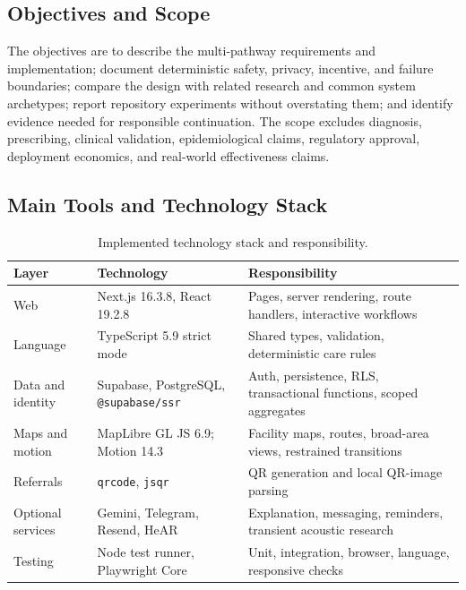 \documentclass[12pt,onecolumn]{IEEEtran}
\newcommand{\code}[1]{\texttt{#1}}
\begin{document}
\subsection{Objectives and Scope}
The objectives are to describe the multi-pathway requirements and implementation; document deterministic safety, privacy, incentive, and failure boundaries; compare the design with related research and common system archetypes; report repository experiments without overstating them; and identify evidence needed for responsible continuation. The scope excludes diagnosis, prescribing, clinical validation, epidemiological claims, regulatory approval, deployment economics, and real-world effectiveness claims.

\subsection{Main Tools and Technology Stack}
\begin{table}[H]
\caption{Implemented technology stack and responsibility.}\label{tab:stack}\centering\small
\begin{tabularx}{\textwidth}{p{}p{}X}
\toprule Layer & Technology & Responsibility \\\midrule
Web & Next.js 16.3.8, React 19.2.8 & Pages, server rendering, route handlers, interactive workflows \\
Language & TypeScript 5.9 strict mode & Shared types, validation, deterministic care rules \\
Data and identity & Supabase, PostgreSQL, \code{@supabase/ssr} & Auth, persistence, RLS, transactional functions, scoped aggregates \\
Maps and motion & MapLibre GL JS 6.9; Motion 14.3 & Facility maps, routes, broad-area views, restrained transitions \\
Referrals & \code{qrcode}, \code{jsqr} & QR generation and local QR-image parsing \\
Optional services & Gemini, Telegram, Resend, HeAR & Explanation, messaging, reminders, transient acoustic research \\
Testing & Node test runner, Playwright Core & Unit, integration, browser, language, responsive checks \\
\bottomrule
\end{tabularx}
\end{table}
\end{document}
